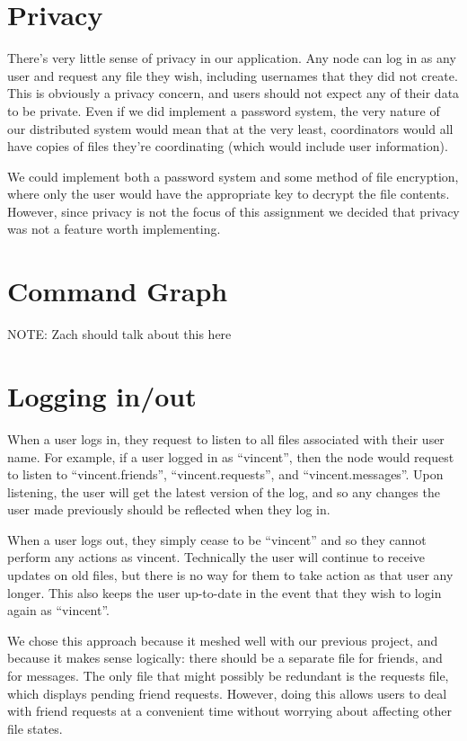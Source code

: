 \documentclass[11pt]{article}
\begin{document}
\section{Privacy}

There's very little sense of privacy in our application. Any node can log in as any user and request any file they wish, including usernames that they did not create. This is obviously a privacy concern, and users should not expect any of their data to be private. Even if we did implement a password system, the very nature of our distributed system would mean that at the very least, coordinators would all have copies of files they're coordinating (which would include user information). 

We could implement both a password system and some method of file encryption, where only the user would have the appropriate key to decrypt the file contents. However, since privacy is not the focus of this assignment we decided that privacy was not a feature worth implementing. 

\section{Command Graph}

NOTE: Zach should talk about this here


\section{Logging in/out}

When a user logs in, they request to listen to all files associated with their user name. For example, if a user logged in as ``vincent'', then the node would request to listen to ``vincent.friends'', ``vincent.requests'', and ``vincent.messages''. Upon listening, the user will get the latest version of the log, and so any changes the user made previously should be reflected when they log in. 

When a user logs out, they simply cease to be ``vincent'' and so they cannot perform any actions as vincent. Technically the user will continue to receive updates on old files, but there is no way for them to take action as that user any longer. This also keeps the user up-to-date in the event that they wish to login again as ``vincent''.

We chose this approach because it meshed well with our previous project, and because it makes sense logically: there should be a separate file for friends, and for messages. The only file that might possibly be redundant is the requests file, which displays pending friend requests. However, doing this allows users to deal with friend requests at a convenient time without worrying about affecting other file states.
\end{document}
